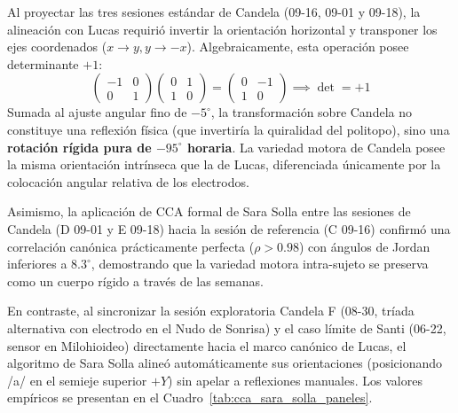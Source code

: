 \documentclass[11pt,a4paper,openany]{book}
\theoremstyle{definition}
\begin{document}
Al proyectar las tres sesiones estándar de Candela (09-16, 09-01 y 09-18), la alineación con Lucas requirió invertir la orientación horizontal y transponer los ejes coordenados ($x \to y, y \to -x$). Algebraicamente, esta operación posee determinante $+1$:
\begin{equation}
    \begin{pmatrix} -1 & 0 \\ 0 & 1 \end{pmatrix} \begin{pmatrix} 0 & 1 \\ 1 & 0 \end{pmatrix} = \begin{pmatrix} 0 & -1 \\ 1 & 0 \end{pmatrix} \implies \det = +1
\end{equation}
Sumada al ajuste angular fino de $-5^\circ$, la transformación sobre Candela no constituye una reflexión física (que invertiría la quiralidad del politopo), sino una \textbf{rotación rígida pura de $-95^\circ$ horaria}. La variedad motora de Candela posee la misma orientación intrínseca que la de Lucas, diferenciada únicamente por la colocación angular relativa de los electrodos.

Asimismo, la aplicación de CCA formal de Sara Solla entre las sesiones de Candela (D 09-01 y E 09-18) hacia la sesión de referencia (C 09-16) confirmó una correlación canónica prácticamente perfecta ($\rho > 0.98$) con ángulos de Jordan inferiores a $8.3^\circ$, demostrando que la variedad motora intra-sujeto se preserva como un cuerpo rígido a través de las semanas.

En contraste, al sincronizar la sesión exploratoria Candela F (08-30, tríada alternativa con electrodo en el Nudo de Sonrisa) y el caso límite de Santi (06-22, sensor en Milohioideo) directamente hacia el marco canónico de Lucas, el algoritmo de Sara Solla alineó automáticamente sus orientaciones (posicionando /a/ en el semieje superior $+Y$) sin apelar a reflexiones manuales. Los valores empíricos se presentan en el Cuadro~\ref{tab:cca_sara_solla_paneles}.
\end{document}
